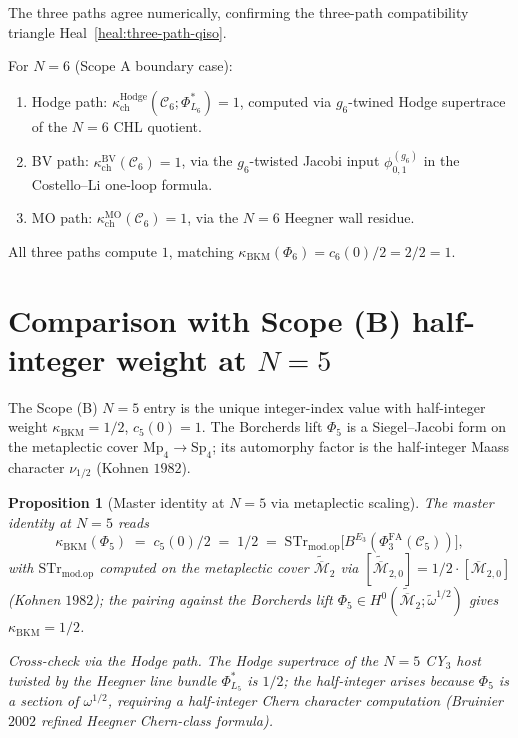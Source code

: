 \documentclass[11pt]{amsart}
\newtheorem{proposition}[theorem]{Proposition}
\providecommand{\cC}{\mathcal{C}}
\providecommand{\Sp}{\mathrm{Sp}}
\providecommand{\Mp}{\mathrm{Mp}}
\providecommand{\PhiFA}{\Phi^{\mathrm{FA}}}
\providecommand{\Mbar}{\overline{\mathcal{M}}}
\providecommand{\BV}{\mathrm{BV}}
\providecommand{\MO}{\mathrm{MO}}
\providecommand{\Hodge}{\mathrm{Hodge}}
\providecommand{\STr}{\mathrm{STr}}
\providecommand{\modop}{\mathrm{mod.op}}
\providecommand{\kBKM}{\kappa_{\mathrm{BKM}}}
\providecommand{\kch}{\kappa_{\mathrm{ch}}}
\begin{document}
The three paths agree numerically, confirming the three-path
compatibility triangle
Heal~\ref{heal:three-path-qiso}.

For $N = 6$ (Scope A boundary case):
\begin{enumerate}[label=\textup{(\roman*)}]
\item Hodge path: $\kch^{\Hodge}(\cC_6; \Phi^*_{L_6}) = 1$, computed
via $g_6$-twined Hodge supertrace of the $N = 6$ CHL quotient.
\item BV path: $\kch^{\BV}(\cC_6) = 1$, via the $g_6$-twisted Jacobi
input $\phi^{(g_6)}_{0, 1}$ in the Costello--Li one-loop formula.
\item MO path: $\kch^{\MO}(\cC_6) = 1$, via the $N = 6$ Heegner wall
residue.
\end{enumerate}

All three paths compute $1$, matching $\kBKM(\Phi_6) = c_6(0)/2 = 2/2
= 1$.

\section{Comparison with Scope (B) half-integer weight at $N = 5$}
\label{sec:half-integer-n5}

The Scope (B) $N = 5$ entry is the unique integer-index value with
half-integer weight $\kBKM = 1/2$, $c_5(0) = 1$. The Borcherds lift
$\Phi_5$ is a Siegel--Jacobi form on the metaplectic cover $\Mp_4 \to
\Sp_4$; its automorphy factor is the half-integer Maass character
$\nu_{1/2}$ (Kohnen $1982$).

\begin{proposition}[Master identity at $N = 5$ via metaplectic
scaling]
\label{prop:master-n5}
The master identity at $N = 5$ reads
\[
 \kBKM(\Phi_5) \;=\; c_5(0)/2 \;=\; 1/2 \;=\;
 \STr_{\modop}\bigl[B^{E_3}(\PhiFA_3(\cC_5))\bigr],
\]
with $\STr_{\modop}$ computed on the metaplectic cover
$\widetilde{\Mbar}_2$ via $[\widetilde{\Mbar}_{2, 0}] = 1/2 \cdot
[\Mbar_{2, 0}]$ (Kohnen $1982$); the pairing against the Borcherds
lift $\Phi_5 \in H^0(\widetilde{\Mbar}_2; \widetilde{\omega}^{1/2})$
gives $\kBKM = 1/2$.

\emph{Cross-check via the Hodge path.} The Hodge supertrace of the
$N = 5$ CY$_3$ host twisted by the Heegner line bundle
$\Phi^*_{L_5}$ is $1/2$; the half-integer arises because $\Phi_5$ is
a section of $\omega^{1/2}$, requiring a half-integer Chern character
computation (Bruinier $2002$ refined Heegner Chern-class formula).
\end{proposition}
\end{document}
